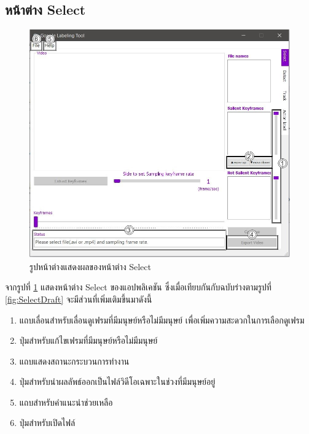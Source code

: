\subsection*{หน้าต่าง Select}
\begin{figure}[!ht]
  \centering
    \includegraphics[scale=0.4]{chapter4/images/Final_ui/Select.jpg}
    \caption{รูปหน้าต่างแสดงผลของหน้าต่าง Select}
    \label{fig:final_select}
\end{figure}
จากรูปที่ \ref{fig:final_select} แสดงหน้าต่าง Select ของแอปพลิเคชัน ซึ่งเมื่อเทียบกันกับฉบับร่างตามรูปที่ \ref{fig:SelectDraft} จะมีส่วนที่เพิ่มเติมขึ้นมาดังนี้
\begin{enumerate}
	\item แถบเลื่อนสำหรับเลื่อนดูเฟรมที่มีมนุษย์หรือไม่มีมนุษย์ เพื่อเพิ่มความสะดวกในการเลือกดูเฟรม
	\item ปุ่มสำหรับแก้ไขเฟรมที่มีมนุษย์หรือไม่มีมนุษย์
	\item แถบแสดงสถานะกระบวนการทำงาน
	\item ปุ่มสำหรับนำผลลัพธ์ออกเป็นไฟล์วิดีโอเฉพาะในช่วงที่มีมนุษย์อยู่
	\item แถบสำหรับคำแนะนำช่วยเหลือ
	\item ปุ่มสำหรับเปิดไฟล์
\end{enumerate}		

\clearpage
